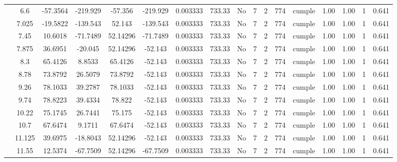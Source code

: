 \begin{table}[H]
{\begin{tabular}{|c|c|c|c|c|c|c|c|c|c|c|c|c|c|c|c|c|}
\cline{2-17}    & \cellcolor[rgb]{ .851,  .882,  .949}6.6 & -57.3564 & -219.929 & -57.356 & -219.929 & 0.003333 & 733.33 & No  & 7   & 2   & 774 & \cellcolor[rgb]{ .776,  .937,  .808}cumple & 1.00 & 1.00 & 1   & 0.641 \bigstrut\\
\cline{2-17}    & 7.025 & -19.5822 & -139.543 & 52.143 & -139.543 & 0.003333 & 733.33 & No  & 7   & 2   & 774 & \cellcolor[rgb]{ .776,  .937,  .808}cumple & 1.00 & 1.00 & 1   & 0.641 \bigstrut\\
\cline{2-17}    & 7.45 & 10.6018 & -71.7489 & 52.14296 & -71.7489 & 0.003333 & 733.33 & No  & 7   & 2   & 774 & \cellcolor[rgb]{ .776,  .937,  .808}cumple & 1.00 & 1.00 & 1   & 0.641 \bigstrut\\
\cline{2-17}    & 7.875 & 36.6951 & -20.045 & 52.14296 & -52.143 & 0.003333 & 733.33 & No  & 7   & 2   & 774 & \cellcolor[rgb]{ .776,  .937,  .808}cumple & 1.00 & 1.00 & 1   & 0.641 \bigstrut\\
\cline{2-17}    & 8.3 & 65.4126 & 8.8533 & 65.4126 & -52.143 & 0.003333 & 733.33 & No  & 7   & 2   & 774 & \cellcolor[rgb]{ .776,  .937,  .808}cumple & 1.00 & 1.00 & 1   & 0.641 \bigstrut\\
\cline{2-17}    & 8.78 & 73.8792 & 26.5079 & 73.8792 & -52.143 & 0.003333 & 733.33 & No  & 7   & 2   & 774 & \cellcolor[rgb]{ .776,  .937,  .808}cumple & 1.00 & 1.00 & 1   & 0.641 \bigstrut\\
\cline{2-17}    & 9.26 & 78.1033 & 39.2787 & 78.1033 & -52.143 & 0.003333 & 733.33 & No  & 7   & 2   & 774 & \cellcolor[rgb]{ .776,  .937,  .808}cumple & 1.00 & 1.00 & 1   & 0.641 \bigstrut\\
\cline{2-17}    & 9.74 & 78.8223 & 39.4334 & 78.822 & -52.143 & 0.003333 & 733.33 & No  & 7   & 2   & 774 & \cellcolor[rgb]{ .776,  .937,  .808}cumple & 1.00 & 1.00 & 1   & 0.641 \bigstrut\\
\cline{2-17}    & 10.22 & 75.1745 & 26.7441 & 75.175 & -52.143 & 0.003333 & 733.33 & No  & 7   & 2   & 774 & \cellcolor[rgb]{ .776,  .937,  .808}cumple & 1.00 & 1.00 & 1   & 0.641 \bigstrut\\
\cline{2-17}    & 10.7 & 67.6474 & 9.1711 & 67.6474 & -52.143 & 0.003333 & 733.33 & No  & 7   & 2   & 774 & \cellcolor[rgb]{ .776,  .937,  .808}cumple & 1.00 & 1.00 & 1   & 0.641 \bigstrut\\
\cline{2-17}    & 11.125 & 39.6975 & -18.8043 & 52.14296 & -52.143 & 0.003333 & 733.33 & No  & 7   & 2   & 774 & \cellcolor[rgb]{ .776,  .937,  .808}cumple & 1.00 & 1.00 & 1   & 0.641 \bigstrut\\
\cline{2-17}    & 11.55 & 12.5374 & -67.7509 & 52.14296 & -67.7509 & 0.003333 & 733.33 & No  & 7   & 2   & 774 & \cellcolor[rgb]{ .776,  .937,  .808}cumple & 1.00 & 1.00 & 1   & 0.641 \bigstrut\\

\end{tabular}}
\end{table}
